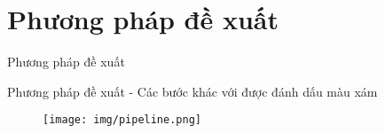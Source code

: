 \documentclass[aspectratio=169, 12pt]{beamer}
\begin{document}


    
    



\section{Phương pháp đề xuất}

\begin{frame}
\vfill
\begin{center}
\Large{Phương pháp đề xuất}
\end{center}
\vfill
\end{frame}

\begin{frame}{Phương pháp đề xuất - \proposedMethod}
    Các bước khác với \prfa được đánh dấu màu xám

    \begin{figure}[!hbpt]
      \centering
      \texttt{[image: img/pipeline.png]}
      \label{fig:proposed_method}
    \end{figure}

\end{frame}
\end{document}
